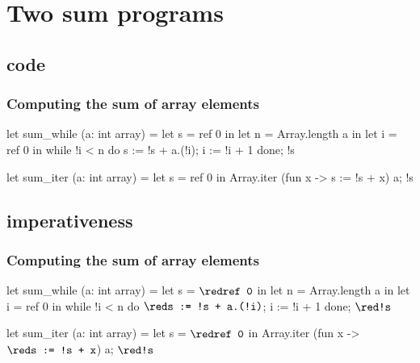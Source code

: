 \documentclass[xcolor=dvipsnames]{beamer}
\begin{document}
\section*{Two sum programs}
\subsection*{code}
\begin{frame}[fragile]\frametitle{Computing the sum of array elements}
\begin{adjustwidth}{-0.3cm}{1.0cm}
\begin{small}
\begin{minipage}[t]{0.4\textwidth}
\begin{whycode}  
let sum_while (a: int array)
= let s = ref 0 in
  let n = Array.length a in
  let i = ref 0 in
  while !i < n do
    s := !s + a.(!i);
    i := !i + 1
  done;
  !s
\end{whycode}
\end{minipage}\hfill
\begin{minipage}[t]{0.4\textwidth}
\begin{whycode} 
let sum_iter (a: int array)
= let s = ref 0 in
  Array.iter 
    (fun x -> s := !s + x) a;
  !s
\end{whycode}	
\end{minipage}
\end{small}
\end{adjustwidth}
\end{frame}
\addtocounter{framenumber}{-1}

\subsection*{imperativeness}
\begin{frame}[fragile]\frametitle{Computing the sum of array elements}
\begin{adjustwidth}{-0.3cm}{1.0cm}
\begin{small}
\begin{minipage}[t]{0.4\textwidth}
\begin{whycode}  
let sum_while (a: int array)
= let s = ${\red \texttt{ref 0}}$ in
  let n = Array.length a in
  let i = ref 0 in
  while !i < n do
    ${\red \texttt{s := !s + a.(!i)}}$;
    i := !i + 1
  done;
  ${\red \texttt{!s}}$
\end{whycode}
\end{minipage}\hfill
\begin{minipage}[t]{0.4\textwidth}
\begin{whycode} 
let sum_iter (a: int array)
= let s = ${\red \texttt{ref 0}}$ in
  Array.iter 
    (fun x -> ${\red \texttt{s := !s + x}}$) a;
   ${\red \texttt{!s}}$
\end{whycode}	
\end{minipage}
\end{small}
\end{adjustwidth}
\end{frame}
\addtocounter{framenumber}{-1}
\end{document}
